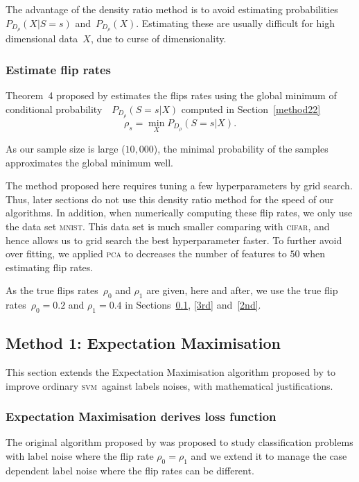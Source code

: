 \documentclass[12pt]{article} %
\newcommand{\svm}{\textsc{svm}}
\begin{document}
The advantage of the density ratio method is to avoid estimating probabilities~${P_{D_\rho}(X|S=s)}$ and~${P_{D_\rho}(X)}$. Estimating these are usually difficult for high dimensional data~$X$, due to curse of dimensionality. 


\subsubsection{Estimate flip rates}\label{method23}
Theorem~4 proposed by \citet{liu2016classification} estimates the flips rates using the global minimum of conditional probability~~$P_{D_\rho}(S=s|X)$ computed in Section~\ref{method22}
\begin{equation*}\label{eq:fliprate}
\rho_s=\min _X P_{D_\rho}(S=s|X).
\end{equation*}

As our sample size is large ($10,000$), the minimal probability of the samples approximates the global minimum well. 

The method proposed here requires tuning a few hyperparameters by grid search. Thus, later sections do not use this density ratio method for the speed of our algorithms.  
In addition, when numerically computing these flip rates, we only use the data set \textsc{mnist}. This data set is much smaller comparing with \textsc{cifar}, and hence allows us to grid search the best hyperparameter faster. To further avoid over fitting, we applied \textsc{pca} to decreases the number of features to $50$ when estimating flip rates.

As the true flips rates~$\rho_0$ and $\rho_1$ are given, here and after, we use the true flip rates~$\rho_0=0.2$ and $\rho_1=0.4$ in Sections~\ref{1st}, \ref{3rd} and~\ref{2nd}.


\subsection{Method 1: Expectation Maximisation}\label{1st}
This section extends the Expectation Maximisation algorithm proposed by \citet{pmlr-v20-biggio11} to improve ordinary \svm\ against labels noises, with mathematical justifications.
\subsubsection{Expectation Maximisation derives loss function}
The original algorithm proposed by \citet{pmlr-v20-biggio11} was proposed to study classification problems with label noise where the flip rate $\rho_0=\rho_1$ and we extend it to manage the case dependent label noise where the flip rates can be different.
\end{document}
